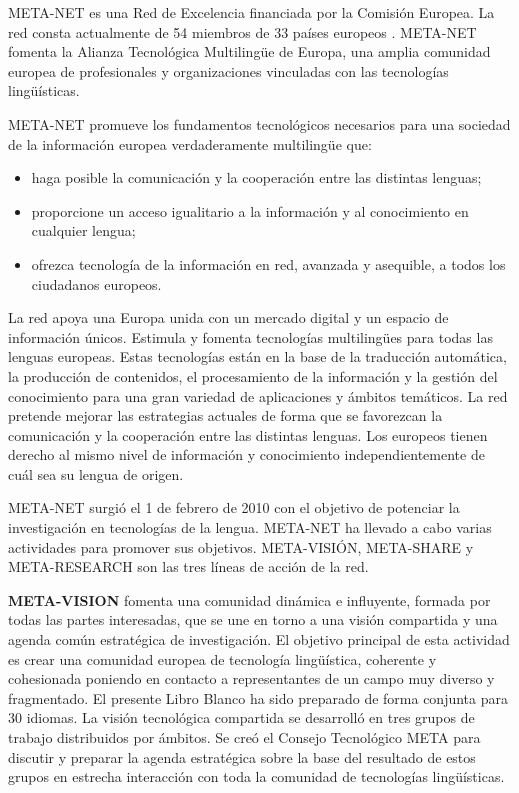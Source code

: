 \begin{multicols}{2}
   META-NET es una Red de Excelencia financiada por la Comisión Europea. La red consta actualmente de 54 miembros de 33 países europeos \cite{rehm2011}. META-NET fomenta la Alianza Tecnológica Multilingüe de Europa, una amplia comunidad europea de profesionales y organizaciones vinculadas con las tecnologías lingüísticas.
  
  META-NET promueve los fundamentos tecnológicos necesarios para una sociedad de la información europea verdaderamente multilingüe que:

\begin{itemize}
  \item haga posible la comunicación y la cooperación entre las distintas lenguas;
  \item proporcione un acceso igualitario a la información y al conocimiento en cualquier lengua;
  \item ofrezca tecnología de la información en red, avanzada y asequible, a todos los ciudadanos europeos.
\end{itemize}

La red apoya una Europa unida con un mercado digital y un espacio de información únicos. Estimula y fomenta tecnologías multilingües para todas las lenguas europeas. Estas tecnologías están en la base de la traducción automática, la producción de contenidos, el procesamiento de la información y la gestión del conocimiento para una gran variedad de aplicaciones y ámbitos temáticos. La red pretende mejorar las estrategias actuales de forma que se favorezcan la comunicación y la cooperación entre las distintas lenguas. Los europeos tienen derecho al mismo nivel de información y conocimiento independientemente de cuál sea su lengua de origen.

META-NET surgió el 1 de febrero de 2010 con el objetivo de potenciar la investigación en tecnologías de la lengua. META-NET ha llevado a cabo varias actividades para promover sus objetivos. META-VISIÓN, META-SHARE y META-RESEARCH son las tres líneas de acción de la red.
 
\textbf{META-VISION} fomenta una comunidad dinámica e influyente, formada por todas las partes interesadas, que se une en torno a una visión compartida y una agenda común estratégica de investigación. El objetivo principal de esta actividad es crear una comunidad europea de tecnología lingüística, coherente y cohesionada poniendo en contacto a representantes de un campo muy diverso y fragmentado. El presente Libro Blanco ha sido preparado de forma conjunta para 30 idiomas. La visión tecnológica compartida se desarrolló en tres grupos de trabajo distribuidos por ámbitos. Se creó el Consejo Tecnológico META para discutir y preparar la agenda estratégica sobre la base del resultado de estos grupos en estrecha interacción con toda la comunidad de tecnologías lingüísticas.


\end{multicols}
